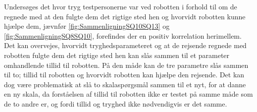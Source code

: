 Undersøges det hvor tryg testpersonerne var ved robotten i forhold til om de regnede med at den fulgte dem det rigtige sted hen og hvorvidt robotten kunne hjælpe dem, jævnfør \autoref{fig:SammenligningSQ10SQ13} og \autoref{fig:SammenligningSQ8SQ10}, forefindes der en positiv korrelation herimellem. Det kan overvejes, hvorvidt tryghedsparameteret og at de rejsende regnede med robotten fulgte dem det rigtige sted hen kan slås sammen til et parameter omhandlende tillid til robotten. På den måde kan de tre parametre slås sammen til to; tillid til robotten og hvorvidt robotten kan hjælpe den rejsende. Det kan dog være problematisk at slå to skalaspørgsmål sammen til et nyt, for at danne en ny skala, da forståelsen af tillid til robotten ikke er testet på samme måde som de to andre er, og fordi tillid og tryghed ikke nødvendigvis er det samme. 

